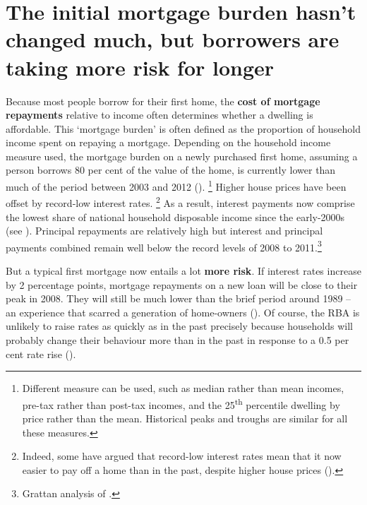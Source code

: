 \section{The initial mortgage burden hasn't changed much, but borrowers are taking more risk for longer}\label{sec:the-initial-mortgage-burden-hasnt-changed-much-but-borrowers-are-taking-more-risk-for-longer}

Because most people borrow for their first home, the \textbf{cost of mortgage repayments} relative to income often determines whether a dwelling is affordable.
This `mortgage burden' is often defined as the proportion of household income spent on repaying a mortgage.
Depending on the household income measure used, the mortgage burden on a newly purchased first home, assuming a person borrows 80 per cent of the value of the home, is currently lower than much of the period between 2003 and 2012 ().%
	\footnote{\textcite{CoreLogic2016-affordability}
Different measure can be used, such as median rather than mean incomes, pre-tax rather than post-tax incomes, and the 25\textsuperscript{th} percentile dwelling by price rather than the mean.
Historical peaks and troughs are similar for all these measures.}
Higher house prices have been offset by record-low interest rates.%
	\footnote{Indeed, some have argued that record-low interest rates mean that it now easier to pay off a home than in the past, despite higher house prices (\textcites{Sloan-housing-affordability}{Koukoulas-2016-millennials}).}
As a result, interest payments now comprise the lowest share of national household disposable income since the early-2000s (see ). Principal repayments are relatively high but interest and principal payments combined remain well below the record levels of 2008 to 2011.\footnote{Grattan analysis of \textcites[][Graph 10]{Lowe2017SomeEvolvingQuestions}{Bullock_2018_Household_Indebtednes}.}

But a typical first mortgage now entails a lot \textbf{more risk}.
If interest rates increase by 2 percentage points, mortgage repayments on a new loan will be close to their peak in 2008. They will still be much lower than the brief period around 1989 -- an experience that scarred a generation of home-owners (). Of course, the RBA is unlikely to raise rates as quickly as in the past precisely because households will probably change their behaviour more than in the past in response to a 0.5 per cent rate rise ().

